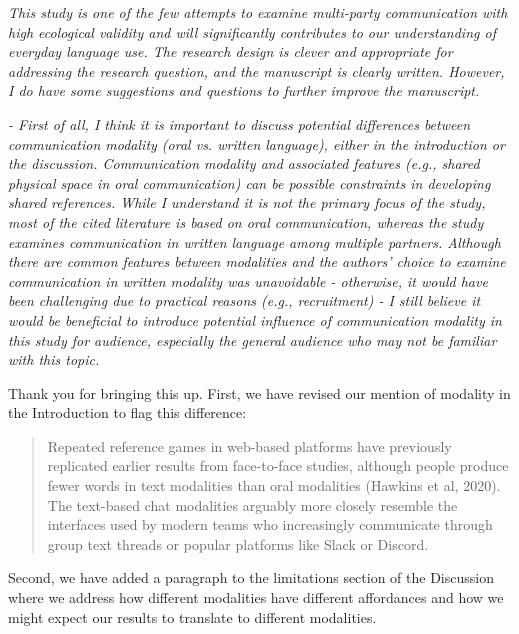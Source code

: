 \documentclass{stanfordletter}
\newcommand{\theysaid}[1]{\begin{leftbar} \noindent 
		\textsl{ #1}\end{leftbar}}
\newcommand{\revised}[1]{\begin{quote}	#1 \end{quote}}
\begin{document}
\begin{letter}{}
          \theysaid{This study is one of the few attempts to examine multi-party communication with high ecological validity and will significantly contributes to our understanding of everyday language use. The research design is clever and appropriate for addressing the research question, and the manuscript is clearly written. However, I do have some suggestions and questions to further improve the manuscript.}
          
          \theysaid{- First of all, I think it is important to discuss potential differences between communication modality (oral vs. written language), either in the introduction or the discussion. Communication modality and associated features (e.g., shared physical space in oral communication) can be possible constraints in developing shared references. While I understand it is not the primary focus of the study, most of the cited literature is based on oral communication, whereas the study examines communication in written language among multiple partners. Although there are common features between modalities and the authors' choice to examine communication in written modality was unavoidable - otherwise, it would have been challenging due to practical reasons (e.g., recruitment) - I still believe it would be beneficial to introduce potential influence of communication modality in this study for audience, especially the general audience who may not be familiar with this topic.}

		Thank you for bringing this up. First, we have revised our mention of modality in the Introduction to flag this difference:
          
          \revised{Repeated reference games in web-based platforms have previously replicated earlier results from face-to-face studies, although people produce fewer words in text modalities than oral modalities (Hawkins et al, 2020). The text-based chat modalities arguably more closely resemble the interfaces used by modern teams who increasingly communicate through group text threads or popular platforms like Slack or Discord.}
          
Second, we have added a paragraph to the limitations section of the Discussion where we address how different modalities have different affordances and how we might expect our results to translate to different modalities.           


\end{letter}
\end{document}
